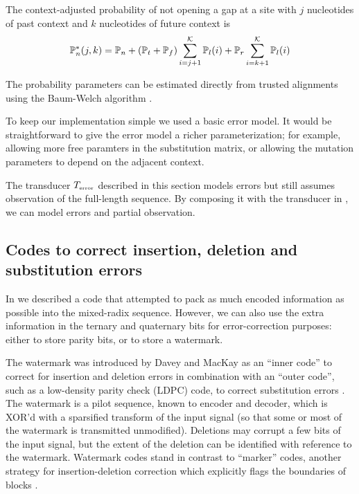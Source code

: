 \documentclass[english]{article}
\begin{document}
The context-adjusted probability of not opening a gap at a site with $j$ nucleotides of past context and $k$ nucleotides of future context is
\[
\mathbb{P}_{n}^\ast(j,k) = \mathbb{P}_{n} + (\mathbb{P}_{t} + \mathbb{P}_{f}) \sum_{i=j+1}^{{\cal K}} \mathbb{P}_{l}(i) + \mathbb{P}_{r} \sum_{i=k+1}^{{\cal K}} \mathbb{P}_{l}(i)
\]

The probability parameters can be estimated directly from trusted alignments using the Baum-Welch algorithm \cite{Durbin98}.

To keep our implementation simple we used a basic error model.
It would be straightforward to give the error model a richer parameterization;
for example, allowing more free paramters in the substitution matrix,
or allowing the mutation parameters to depend on the adjacent context.

The transducer $T_{\mbox{\tiny error}}$
described in this section models errors but still assumes observation of the full-length sequence.
By composing it with the transducer in , we can model errors and partial observation.

\subsection{Codes to correct insertion, deletion and substitution errors}

In  we described a code that attempted to pack as much encoded information as possible into the mixed-radix sequence.
However, we can also use the extra information in the ternary and quaternary bits for error-correction purposes:
either to store parity bits, or to store a watermark.

The watermark was introduced by Davey and MacKay as an ``inner code'' to correct for insertion and deletion errors
in combination with an ``outer code'', such as a low-density parity check (LDPC) code, to correct substitution errors \cite{DaveyMackay2000,DaveyMackay2001}.
The watermark is a pilot sequence, known to encoder and decoder, which is XOR'd with a sparsified transform of the input signal
(so that some or most of the watermark is transmitted unmodified).
Deletions may corrupt a few bits of the input signal, but the extent of the deletion can be identified with reference to the watermark.
Watermark codes stand in contrast to ``marker'' codes, another strategy for insertion-deletion correction which explicitly flags the boundaries of blocks \cite{RatzerMackay2000}.
\end{document}
